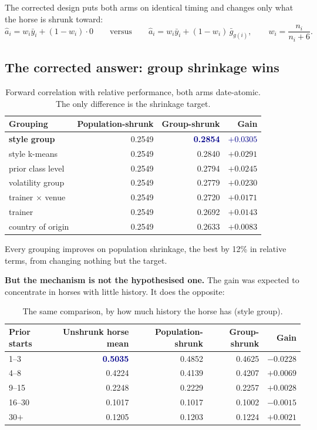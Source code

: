 \documentclass[11pt,a4paper]{article}
\newcommand{\good}[1]{\textcolor{darkblue}{\textbf{#1}}}
\newcommand{\bad}[1]{\textcolor{warm}{\textbf{#1}}}
\begin{document}
The corrected design puts both arms on identical timing and changes only what the
horse is shrunk toward:
\[
\hat{a}_i = w_i \bar{y}_i + (1-w_i)\cdot 0
\qquad\text{versus}\qquad
\hat{a}_i = w_i \bar{y}_i + (1-w_i)\,\bar{g}_{g(i)},
\qquad w_i=\frac{n_i}{n_i+6}.
\]

\subsection{The corrected answer: group shrinkage wins}

\begin{table}[htbp]\centering\small
\caption{Forward correlation with relative performance, both arms date-atomic.
The only difference is the shrinkage target.}
\begin{tabular}{lrrr}
\toprule
Grouping & Population-shrunk & Group-shrunk & Gain\\
\midrule
\textbf{style group} & 0.2549 & \good{0.2854} & \good{$+0.0305$}\\
style k-means & 0.2549 & 0.2840 & $+0.0291$\\
prior class level & 0.2549 & 0.2794 & $+0.0245$\\
volatility group & 0.2549 & 0.2779 & $+0.0230$\\
trainer $\times$ venue & 0.2549 & 0.2720 & $+0.0171$\\
trainer & 0.2549 & 0.2692 & $+0.0143$\\
country of origin & 0.2549 & 0.2633 & $+0.0083$\\
\bottomrule
\end{tabular}
\end{table}

Every grouping improves on population shrinkage, the best by 12\% in relative
terms, from changing nothing but the target.

\textbf{But the mechanism is not the hypothesised one.} The gain was expected to
concentrate in horses with little history. It does the opposite:

\begin{table}[htbp]\centering\small
\caption{The same comparison, by how much history the horse has (style group).}
\begin{tabular}{lrrrr}
\toprule
Prior starts & Unshrunk horse mean & Population-shrunk & Group-shrunk & Gain\\
\midrule
1--3 & \good{0.5035} & 0.4852 & 0.4625 & \bad{$-0.0228$}\\
4--8 & 0.4224 & 0.4139 & 0.4207 & $+0.0069$\\
9--15 & 0.2248 & 0.2229 & 0.2257 & $+0.0028$\\
16--30 & 0.1017 & 0.1017 & 0.1002 & $-0.0015$\\
30$+$ & 0.1205 & 0.1203 & 0.1224 & $+0.0021$\\
\bottomrule
\end{tabular}
\end{table}
\end{document}
